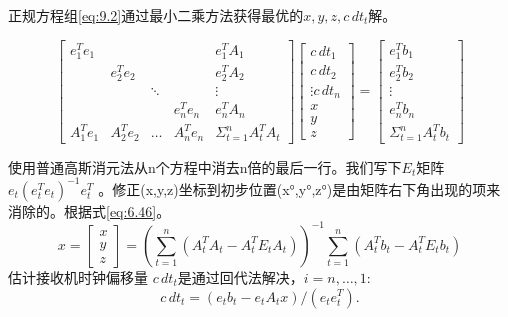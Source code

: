	正规方程组\ref{eq:9.2}通过最小二乘方法获得最优的$x,y,z,c\,dt_t$解。
	
	\begin{equation}\label{eq:9.3}
	\begin{bmatrix}
	e^T_1e_1 & & & & e^T_1A_1 \\
	& e^T_2e_2 & & & e^T_2A_2 \\
	& & \ddots   & & \vdots	  \\
	& & & e^T_ne_n & e^T_nA_n \\
	A^T_1e_1 & A^T_2e_2 & \ldots & A^T_ne_n & \Sigma ^n_{t=1}A^T_tA_t
	\end{bmatrix}
	\begin{bmatrix}
	c\,dt_1 \\
	c\,dt_2 \\
	\vdots
	c\,dt_n \\
	x \\
	y \\
	z 
	\end{bmatrix}
	=
	\begin{bmatrix}
	e^T_1b_1 \\
	e^T_2b_2 \\
	\vdots	 \\
	e^T_nb_n \\
	\Sigma ^n_{t=1}A^T_tb_t
	\end{bmatrix}
	\end{equation}
	
	使用普通高斯消元法从n个方程中消去n倍的最后一行。我们写下$E_t$矩阵$e_t(e^T_te_t)^{-1}e^T_t$ 。修正(x,y,z)坐标到初步位置(x°,y°,z°)是由矩阵右下角出现的项来消除的。根据式\ref{eq:6.46}。
	$$x=\begin{bmatrix}
	x \\ y \\ z
	\end{bmatrix}=\left( \sum^n_{t=1}(A^T_tA_t-A^T_tE_tA_t)\right)^{-1}\sum^n_{t=1}(A^T_tb_t-A^T_tE_tb_t) $$
	估计接收机时钟偏移量 $c\,dt_t$是通过回代法解决，$i=n,\ldots,1$:
	\begin{equation}
	c\,dt_t=(e_tb_t-e_tA_tx)/(e_te_t^T).
	\end{equation}
	
